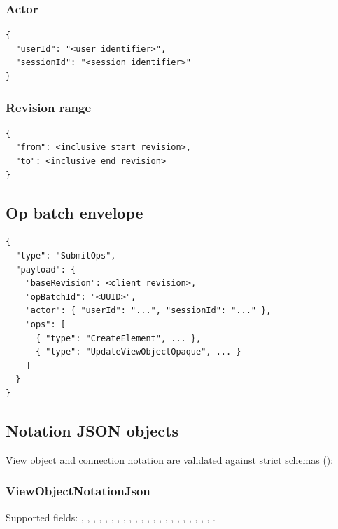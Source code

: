 \subsubsection{Actor}

\begin{lstlisting}[caption={Actor object}]
{
  "userId": "<user identifier>",
  "sessionId": "<session identifier>"
}
\end{lstlisting}

\subsubsection{Revision range}

\begin{lstlisting}[caption={Revision range object}]
{
  "from": <inclusive start revision>,
  "to": <inclusive end revision>
}
\end{lstlisting}

\subsection{Op batch envelope}

\begin{lstlisting}[caption={SubmitOps payload}]
{
  "type": "SubmitOps",
  "payload": {
    "baseRevision": <client revision>,
    "opBatchId": "<UUID>",
    "actor": { "userId": "...", "sessionId": "..." },
    "ops": [
      { "type": "CreateElement", ... },
      { "type": "UpdateViewObjectOpaque", ... }
    ]
  }
}
\end{lstlisting}

\subsection{Notation JSON objects}

View object and connection notation are validated against strict schemas
():

\subsubsection{ViewObjectNotationJson}

Supported fields: , , , ,
, , , ,
, , ,
, ,
, , ,
, , ,
, , ,
.

